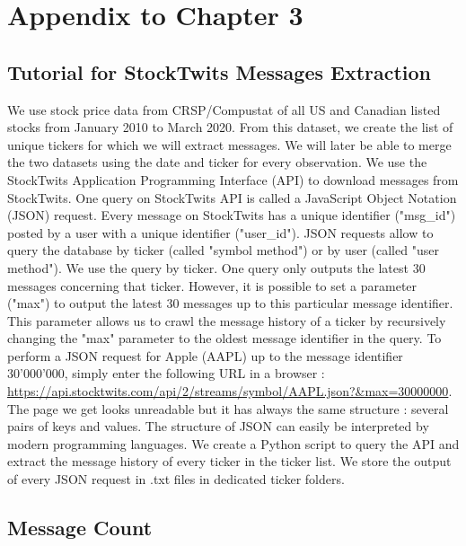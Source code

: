 


\newpage 

\section{Appendix to Chapter 3}

\subsection{Tutorial for StockTwits Messages Extraction}\label{app_tut}

We use stock price data from CRSP/Compustat of all US and Canadian listed stocks from January 2010 to March 2020. From this dataset, we create the list of unique tickers for which we will extract messages. We will later be able to merge the two datasets using the date and ticker for every observation. We use the StockTwits Application Programming Interface (API) to download messages from StockTwits. One query on StockTwits API is called a JavaScript Object Notation (JSON) request. Every message on StockTwits has a unique identifier ("msg\_id") posted by a user with a unique identifier ("user\_id"). JSON requests allow to query the database by ticker (called "symbol method") or by user (called "user method"). We use the query by ticker. One query only outputs the latest 30 messages concerning that ticker. However, it is possible to set a parameter ("max") to output the latest 30 messages up to this particular message identifier. This parameter allows us to crawl the message history of a ticker by recursively changing the "max" parameter to the oldest message identifier in the query. To perform a JSON request for Apple (AAPL) up to the message identifier 30'000'000, simply enter the following URL in a browser : \url{https://api.stocktwits.com/api/2/streams/symbol/AAPL.json?\&max=30000000}. The page we get looks unreadable but it has always the same structure : several pairs of keys and values. The structure of JSON can easily be interpreted by modern programming languages. We create a Python script to query the API and extract the message history of every ticker in the ticker list. We store the output of every JSON request in .txt files in dedicated ticker folders.



\subsection{Message Count}\label{app_counting}

